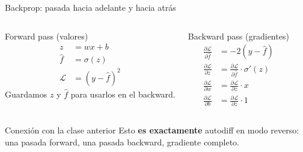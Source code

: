 \documentclass[aspectratio=169,12pt]{beamer}
\begin{document}
\begin{frame}{Backprop: pasada hacia adelante y hacia atrás}
\vspace{-0.5cm}
\begin{columns}[T]
\begin{resultbox}{Forward pass (valores)}
	\vspace{-0.5cm}
\begin{align*}
  z &= wx + b \\
  \hat{f} &= \sigma(z) \\
  \mathcal{L} &= (y - \hat{f})^2
\end{align*}
Guardamos $z$ y $\hat{f}$ para usarlos en el backward.
\end{resultbox}

\begin{defbox}{Backward pass (gradientes)}
	\vspace{-0.5cm}
\begin{align*}
  \frac{\partial\mathcal{L}}{\partial \hat{f}} &= -2(y-\hat{f}) \\[4pt]
  \frac{\partial\mathcal{L}}{\partial z} &= \frac{\partial\mathcal{L}}{\partial \hat{f}}\cdot\sigma'(z) \\[4pt]
  \frac{\partial\mathcal{L}}{\partial w} &= \frac{\partial\mathcal{L}}{\partial z}\cdot x \\[4pt]
  \frac{\partial\mathcal{L}}{\partial b} &= \frac{\partial\mathcal{L}}{\partial z}\cdot 1
\end{align*}
\end{defbox}
\end{columns}

\begin{obsbox}{Conexión con la clase anterior}
Esto \textbf{es exactamente} autodiff en modo reverso: una pasada forward, una pasada backward, gradiente completo.
\end{obsbox}
\end{frame}
\end{document}
